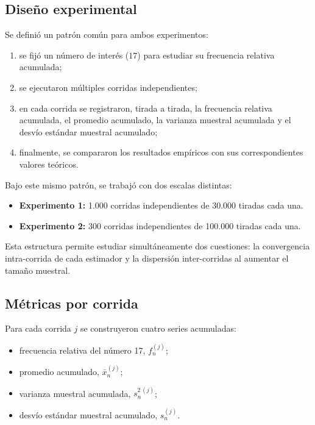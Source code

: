 \documentclass{article}
\begin{document}
\subsection{Diseño experimental}
Se definió un patrón común para ambos experimentos:

\begin{enumerate}
    \item se fijó un número de interés ($17$) para estudiar su frecuencia relativa acumulada;
    \item se ejecutaron múltiples corridas independientes;
    \item en cada corrida se registraron, tirada a tirada, la frecuencia relativa acumulada, el promedio acumulado, la varianza muestral acumulada y el desvío estándar muestral acumulado;
    \item finalmente, se compararon los resultados empíricos con sus correspondientes valores teóricos.
\end{enumerate}

Bajo este mismo patrón, se trabajó con dos escalas distintas:

\begin{itemize}
    \item \textbf{Experimento 1:} 1.000 corridas independientes de 30.000 tiradas cada una.
    \item \textbf{Experimento 2:} 300 corridas independientes de 100.000 tiradas cada una.
\end{itemize}

Esta estructura permite estudiar simultáneamente dos cuestiones: la convergencia intra-corrida de cada estimador y la dispersión inter-corridas al aumentar el tamaño muestral.

\subsection{Métricas por corrida}
Para cada corrida $j$ se construyeron cuatro series acumuladas:

\begin{itemize}
    \item frecuencia relativa del número 17, $f_n^{(j)}$;
    \item promedio acumulado, $\bar{x}_n^{(j)}$;
    \item varianza muestral acumulada, $s_{n}^{2\,(j)}$;
    \item desvío estándar muestral acumulado, $s_n^{(j)}$.
\end{itemize}
\end{document}
